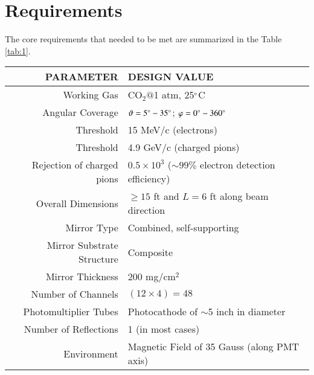 \section{Requirements}

The core requirements that needed to be met are summarized in the Table \ref{tab:1}.

\begin{table*}[t]
	\centering
	\caption{Core Requirements}
	\begin{tabular}{ | r | l | }
		\hline
		PARAMETER & DESIGN VALUE \\ 
		\hline
		Working Gas & CO$_2@$1 atm, 25$\degree$C  \\ 
		\hline
		Angular Coverage & $\vartheta = 5\degree - 35\degree$; $\varphi = 0\degree - 360\degree$ \\
		\hline
		Threshold & 15 MeV/c (electrons) \\
		\hline
		Threshold & 4.9 GeV/c (charged pions) \\
		\hline
		Rejection of charged pions & $0.5 \times 10^3$  ($\sim99\%$ electron detection efficiency)  \\
		\hline
		Overall Dimensions & $\geq 15$ ft and $L = 6$ ft along beam direction  \\
		\hline
		Mirror Type & Combined, self-supporting  \\
		\hline
		Mirror Substrate Structure & Composite  \\
		\hline
		Mirror Thickness & 200 mg/cm$^2$  \\
		\hline
		Number of Channels & $(12 \times 4) = 48$  \\
		\hline
		Photomultiplier Tubes & Photocathode of $\sim$5 inch in diameter  \\
		\hline
		Number of Reflections & 1 (in most cases)   \\
		\hline
		Environment & Magnetic Field of 35 Gauss (along PMT axis)   \\
		\hline
	\end{tabular}
	\label{tab:1}
\end{table*}

